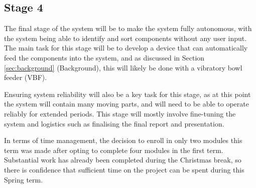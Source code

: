 \subsection{Stage 4}
The final stage of the system will be to make the system fully autonomous, with the system being able to identify and sort components without any user input.
The main task for this stage will be to develop a device that can automatically feed the components into the system, and as 
discussed in Section \ref*{sec:background} (Background), this will likely be done with a vibratory bowl feeder (VBF).

Ensuring system reliability will also be a key task for this stage, as at this point the system will contain many moving parts, and will need to be able to
operate reliably for extended periods. This stage will mostly involve fine-tuning the system and logistics such as
finalising the final report and presentation.

\noindent
In terms of time management, the decision to enroll in only two modules this term was made after opting to complete four modules in the first term. Substantial work has already been completed
during the Christmas break, so there is confidence that sufficient time on the project can be spent during this Spring term.


